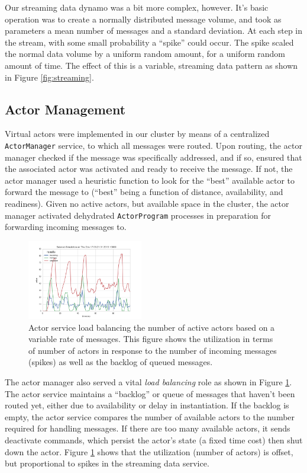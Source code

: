 \documentclass[conference,twocolumn,10pt]{IEEEtran}
\begin{document}
Our streaming data dynamo was a bit more complex, however. It's basic operation was to create a normally distributed message volume, and took as parameters a mean number of messages and a standard deviation. At each step in the stream, with some small probability a ``spike'' could occur. The spike scaled the normal data volume by a uniform random amount, for a uniform random amount of time. The effect of this is a variable, streaming data pattern as shown in Figure \ref{fig:streaming}.

\subsection{Actor Management}

Virtual actors were implemented in our cluster by means of a centralized \texttt{ActorManager} service, to which all messages were routed. Upon routing, the actor manager checked if the message was specifically addressed, and if so, ensured that the associated actor was activated and ready to receive the message. If not, the actor manager used a heuristic function to look for the ``best'' available actor to forward the message to (``best'' being a function of distance, availability, and readiness). Given no active actors, but available space in the cluster, the actor manager activated dehydrated \texttt{ActorProgram} processes in preparation for forwarding incoming messages to.

\begin{figure}[!h]
    \centering
    \includegraphics[width=0.45\textwidth]{balance_sim_queue_lag_zero}
    \caption{Actor service load balancing the number of active actors based on a variable rate of messages. This figure shows the utilization in terms of number of actors in response to the number of incoming messages (spikes) as well as the backlog of queued messages.}
    \label{fig:load_balance}
\end{figure}

The actor manager also served a vital \textit{load balancing} role as shown in Figure \ref{fig:load_balance}. The actor service maintains a ``backlog'' or queue of messages that haven't been routed yet, either due to availability or delay in instantiation. If the backlog is empty, the actor service compares the number of available actors to the number required for handling messages. If there are too many available actors, it sends deactivate commands, which persist the actor's state (a fixed time cost) then shut down the actor. Figure \ref{fig:load_balance} shows that the utilization (number of actors) is offset, but proportional to spikes in the streaming data service.
\end{document}

